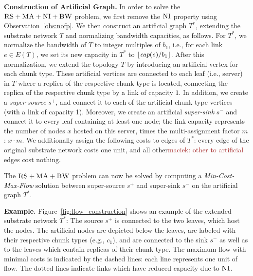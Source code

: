 \documentclass[9pt]{sigcomm-alternate}
\newcommand{\maciek}[1]{\textcolor{brown}{maciek: #1}}
\newcommand{\MaFactor}{m}
\newcommand{\Source}{\ensuremath{s^{+}}}
\newcommand{\Sink}{\ensuremath{s^{-}}}
\newcommand{\achunk}{\ensuremath{c}}
\newcommand{\capacity}{\emph{cap}}
\newcommand{\CC}{\textsc{NI}}
\newcommand{\FP}{\textsc{FP}}
\newcommand{\RS}{\textsc{RS}}
\newcommand{\BW}{\textsc{BW}}
\newcommand{\MA}{\textsc{MA}}
\newcommand{\Tree}{\ensuremath{T}}
\newcommand{\CostTrans}{\ensuremath{b_1}}
\begin{document}

\textbf{Construction of Artificial Graph.}
In order to solve the $\RS+\MA+\CC+\BW$ problem,
we first remove the $\CC$ property using Observation~\ref{obs:nofp}.
We then construct
an artificial graph $\Tree^*$, extending the substrate network $\Tree$ and
normalizing bandwidth capacities, as follows. For $\Tree^*$,
we normalize the bandwidth of $\Tree$ to integer multiples of $\CostTrans$,
i.e., for each link $e\in E(\Tree)$, we set its new
capacity in $\Tree^*$ to $\lfloor\capacity(e)/\CostTrans\rfloor$.
After this normalization, we extend the topology $\Tree$ by
introducing an artificial vertex for each chunk type. These artificial
vertices are connected to each leaf (i.e., server) in $\Tree$ where a replica
 of the respective chunk type is located,
connecting the replica of the respective chunk type by a link of capacity $1$. In
addition, we create a
\emph{super-source} $\Source$, and connect it to each of the artificial chunk
type vertices (with a link of capacity 1). Moreover, we create an artificial \emph{super-sink} $\Sink$ and
connect it to every leaf containing at least one node; the link capacity represents
the number of nodes $x$ hosted on this server, times the multi-assignment factor
$\MaFactor$:
$x \cdot \MaFactor$.
We additionally assign the following costs to edges of $\Tree^*$:
every edge of the original substrate network costs one unit, and all other\maciek{other to artificial} edges
cost nothing.

The $\RS+\MA+\BW$ problem can now be solved by computing
a \emph{Min-Cost-Max-Flow} solution between super-source $\Source$ and super-sink $\Sink$ on the artificial graph $\Tree^*$.

\textbf{Example.} Figure~\ref{fig:flow_construction} shows an example of the extended substrate
network $\Tree^*$: The source $\Source$ is connected to the two leaves, which host the
nodes. The artificial nodes are depicted below the leaves, are labeled with
their respective chunk types (e.g., $\achunk_1$), and are connected to the sink
$\Sink$ as well as to the leaves which contain replicas of their chunk type.
The
maximum flow with minimal costs is indicated by the dashed lines: each line
represents one unit of flow. The dotted lines indicate links which have reduced
capacity due to $\CC$.
\end{document}
